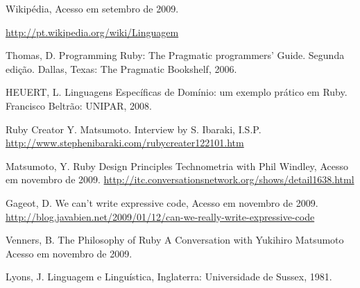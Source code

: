 \documentclass[espaco=simples,appendix=Name]{abnt}
\begin{document}

\begin{thebibliography}{9} 
Wikipédia, 
Acesso em setembro de 2009.

\url{http://pt.wikipedia.org/wiki/Linguagem}

Thomas, D. 
Programming Ruby: The Pragmatic programmers’ Guide. 
Segunda edição. Dallas, Texas: The Pragmatic Bookshelf, 2006.

HEUERT, L. 
Linguagens Específicas de Domínio: um exemplo prático em Ruby.
Francisco Beltrão: UNIPAR, 2008.

Ruby Creator Y. Matsumoto.
Interview by S. Ibaraki, I.S.P.
\url{http://www.stephenibaraki.com/rubycreater122101.htm}

Matsumoto, Y.
Ruby Design Principles
Technometria with Phil Windley, 
Acesso em novembro de 2009.
\url{http://itc.conversationsnetwork.org/shows/detail1638.html}

Gageot, D.
We can’t write expressive code,
Acesso em novembro de 2009.
\url{http://blog.javabien.net/2009/01/12/can-we-really-write-expressive-code}

Venners, B. The Philosophy of Ruby
A Conversation with Yukihiro Matsumoto
Acesso em novembro de 2009.

Lyons, J.
Linguagem e Linguística,
Inglaterra: Universidade de Sussex, 1981.

\end{thebibliography} 
\end{document}
